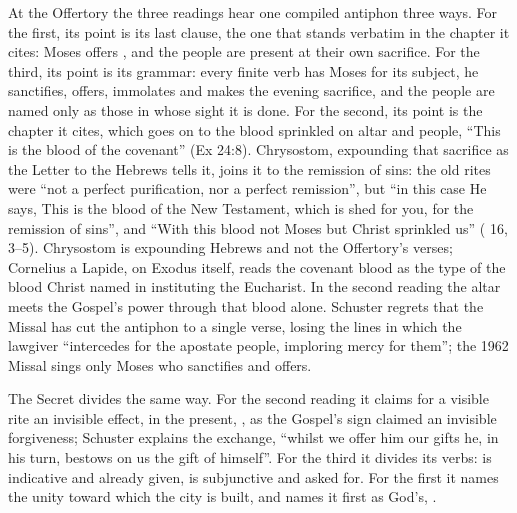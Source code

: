 At the Offertory the three readings hear one compiled antiphon three ways. For
the first, its point is its last clause, the one that stands verbatim in the
chapter it cites: Moses offers , and the
people are present at their own sacrifice. For the third, its point is its
grammar: every finite verb has Moses for its subject, he sanctifies, offers,
immolates and makes the evening sacrifice, and the people are named only as
those in whose sight it is done. For the second, its point is the chapter it
cites, which goes on to the blood sprinkled on altar and people, ``This is the
blood of the covenant'' (Ex 24:8). Chrysostom, expounding that sacrifice as the
Letter to the Hebrews tells it, joins it to the remission of sins: the old rites
were ``not a perfect purification, nor a perfect remission'', but ``in this case
He says, This is the blood of the New Testament, which is shed for you, for the
remission of sins'', and ``With this blood not Moses but Christ sprinkled us''
( 16, 3--5). Chrysostom is expounding Hebrews and not
the Offertory's verses; Cornelius a Lapide, on Exodus itself, reads the
covenant blood as the type of the blood Christ named in instituting the
Eucharist. In the second reading the altar meets the Gospel's power through
that blood alone. Schuster regrets that the Missal has cut the antiphon to a single
verse, losing the lines in which the lawgiver ``intercedes for the apostate
people, imploring mercy for them''; the 1962 Missal sings only Moses who
sanctifies and offers.

The Secret divides the same way. For the second reading it claims for a visible
rite an invisible effect, in the present, , as the Gospel's sign
claimed an invisible forgiveness; Schuster explains the exchange, ``whilst we
offer him our gifts he, in his turn, bestows on us the gift of himself''. For
the third it divides its verbs:  is
indicative and already given,  is
subjunctive and asked for. For the first it names the unity toward which the
city is built, and names it first as God's, .

